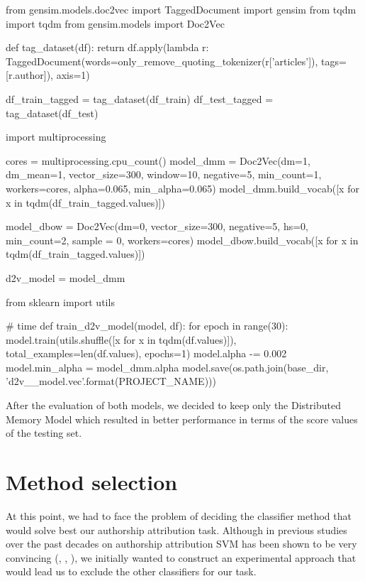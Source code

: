 \begin{lstlisting}[frame=none,caption={Doc2Vec for features extraction with gensim python library.},captionpos=b,label=lst:doc2vectrain]
\end{lstlisting}
\begin{python}	
	from gensim.models.doc2vec import TaggedDocument
	import gensim
	from tqdm import tqdm
	from gensim.models import Doc2Vec
	
	def tag_dataset(df):
		return df.apply(lambda r: TaggedDocument(words=only_remove_quoting_tokenizer(r['articles']), tags=[r.author]), axis=1)
	
	df_train_tagged = tag_dataset(df_train)
	df_test_tagged = tag_dataset(df_test)
	
	import multiprocessing
	
	cores = multiprocessing.cpu_count()
	model_dmm = Doc2Vec(dm=1, dm_mean=1, vector_size=300, window=10, negative=5, min_count=1, workers=cores, alpha=0.065, min_alpha=0.065)
	model_dmm.build_vocab([x for x in tqdm(df_train_tagged.values)])
	
	model_dbow = Doc2Vec(dm=0, vector_size=300, negative=5, hs=0, min_count=2, sample = 0, workers=cores)
	model_dbow.build_vocab([x for x in tqdm(df_train_tagged.values)])
	
	d2v_model = model_dmm
	
	from sklearn import utils
	
	# time
	def train_d2v_model(model, df):
		for epoch in range(30):
			model.train(utils.shuffle([x for x in tqdm(df.values)]), total_examples=len(df.values), epochs=1)
			model.alpha -= 0.002
			model.min_alpha = model_dmm.alpha
		model.save(os.path.join(base_dir, 'd2v_{}_model.vec'.format(PROJECT_NAME)))
\end{python}

After the evaluation of both models, we decided to keep only the Distributed Memory Model which resulted in better performance in terms of the score values of the testing set.

\section{Method selection}
At this point, we had to face the problem of deciding the classifier method that would solve best our authorship attribution task.
Although in previous studies over the past decades on authorship attribution SVM has been shown to be very convincing (\cite{diederich2003authorship}, \cite{koppel2005determining}, \cite{zheng2006framework}), we initially wanted to construct an experimental approach that would lead us to exclude the other classifiers for our task.
